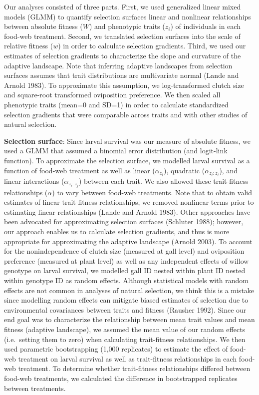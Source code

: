 \documentclass[11pt,]{article}
\begin{document}
Our analyses consisted of three parts. First, we used generalized linear
mixed models (GLMM) to quantify selection surfaces \textemdash linear
and nonlinear relationships between absolute fitness (\(W\)) and
phenotypic traits (\(z_i\)) of individuals \textemdash in each food-web
treatment. Second, we translated selection surfaces into the scale of
relative fitness (\(w\)) in order to calculate selection gradients.
Third, we used our estimates of selection gradients to characterize the
slope and curvature of the adaptive landscape. Note that inferring
adaptive landscapes from selection surfaces assumes that trait
distributions are multivariate normal (Lande and Arnold 1983). To
approximate this assumption, we log-transformed clutch size and
square-root transformed oviposition preference. We then scaled all
phenotypic traits (mean=0 and SD=1) in order to calculate standardized
selection gradients that were comparable across traits and with other
studies of natural selection.

\textbf{Selection surface}: Since larval survival was our measure of
absolute fitness, we used a GLMM that assumed a binomial error
distribution (and logit-link function). To approximate the selection
surface, we modelled larval survival as a function of food-web treatment
as well as linear (\(\alpha_{z_i}\)), quadratic (\(\alpha_{z_i:z_i}\)),
and linear interactions (\(\alpha_{z_i:z_j}\)) between each trait. We
also allowed these trait-fitness relationships (\(\alpha\)) to vary
between food-web treatments. Note that to obtain valid estimates of
linear trait-fitness relationships, we removed nonlinear terms prior to
estimating linear relationships (Lande and Arnold 1983). Other
approaches have been advocated for approximating selection surfaces
(Schluter 1988); however, our approach enables us to calculate selection
gradients, and thus is more appropriate for approximating the adaptive
landscape (Arnold 2003). To account for the nonindependence of clutch
size (measured at gall level) and oviposition preference (measured at
plant level) as well as any independent effects of willow genotype on
larval survival, we modelled gall ID nested within plant ID nested
within genotype ID as random effects. Although statistical models with
random effects are not common in analyses of natural selection, we think
this is a mistake since modelling random effects can mitigate biased
estimates of selection due to environmental covariances between traits
and fitness (Rausher 1992). Since our end goal was to characterize the
relationship between mean trait values and mean fitness (adaptive
landscape), we assumed the mean value of our random effects
(i.e.~setting them to zero) when calculating trait-fitness
relationships. We then used parametric bootstrapping (1,000 replicates)
to estimate the effect of food-web treatment on larval survival as well
as trait-fitness relationships in each food-web treatment. To determine
whether trait-fitness relationships differed between food-web
treatments, we calculated the difference in bootstrapped replicates
between treatments.
\end{document}
